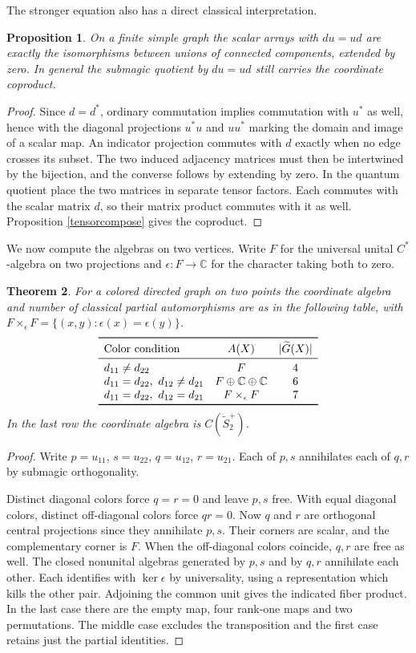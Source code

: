 \documentclass[11pt,a4paper]{article}
\newtheorem{thm}{Theorem}[section]
\newtheorem{prop}[thm]{Proposition}
\begin{document}
The stronger equation also has a direct classical interpretation.

\begin{prop}
On a finite simple graph the scalar arrays with $du=ud$ are exactly the isomorphisms between unions of connected components, extended by zero. In general the submagic quotient by $du=ud$ still carries the coordinate coproduct.
\end{prop}
\begin{proof}
Since $d=d^*$, ordinary commutation implies commutation with $u^*$ as well, hence with the diagonal projections $u^*u$ and $uu^*$ marking the domain and image of a scalar map. An indicator projection commutes with $d$ exactly when no edge crosses its subset. The two induced adjacency matrices must then be intertwined by the bijection, and the converse follows by extending by zero. In the quantum quotient place the two matrices in separate tensor factors. Each commutes with the scalar matrix $d$, so their matrix product commutes with it as well. Proposition \ref{tensorcompose} gives the coproduct.
\end{proof}

We now compute the algebras on two vertices. Write $F$ for the universal unital $C^*$-algebra on two projections and $\epsilon:F\to\mathbb C$ for the character taking both to zero.

\begin{thm}\label{two}
For a colored directed graph on two points the coordinate algebra and number of classical partial automorphisms are as in the following table, with $F\times_\epsilon F=\{(x,y):\epsilon(x)=\epsilon(y)\}$.
\[
\begin{array}{lcc}
\toprule
 \text{Color condition} & A(X) & |\widetilde G(X)|\\
\midrule
 d_{11}\ne d_{22} & F & 4\\
 d_{11}=d_{22},\ d_{12}\ne d_{21} & F\oplus\mathbb C\oplus\mathbb C & 6\\
 d_{11}=d_{22},\ d_{12}=d_{21} & F\times_\epsilon F & 7\\
\bottomrule
\end{array}
\]
In the last row the coordinate algebra is $C(\widetilde S_2^+)$.
\end{thm}
\begin{proof}
Write $p=u_{11}$, $s=u_{22}$, $q=u_{12}$, $r=u_{21}$. Each of $p,s$ annihilates each of $q,r$ by submagic orthogonality.

Distinct diagonal colors force $q=r=0$ and leave $p,s$ free. With equal diagonal colors, distinct off-diagonal colors force $qr=0$. Now $q$ and $r$ are orthogonal central projections since they annihilate $p,s$. Their corners are scalar, and the complementary corner is $F$. When the off-diagonal colors coincide, $q,r$ are free as well. The closed nonunital algebras generated by $p,s$ and by $q,r$ annihilate each other. Each identifies with $\ker\epsilon$ by universality, using a representation which kills the other pair. Adjoining the common unit gives the indicated fiber product. In the last case there are the empty map, four rank-one maps and two permutations. The middle case excludes the transposition and the first case retains just the partial identities.
\end{proof}
\end{document}
